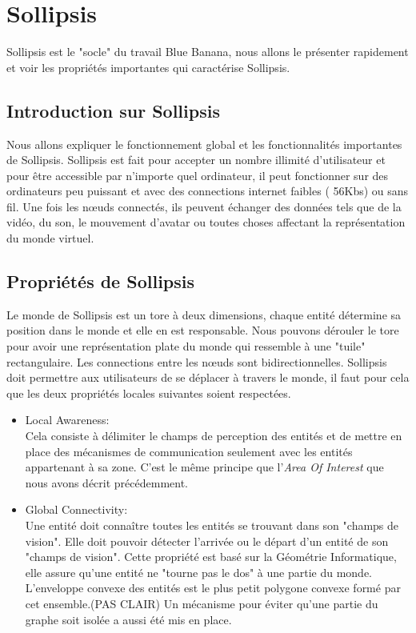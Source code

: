 \section{Sollipsis}
	\label{sollipsis}
	Sollipsis est le "socle" du travail Blue Banana, nous allons le présenter rapidement et voir les propriétés importantes qui caractérise Sollipsis.
	\subsection{Introduction sur Sollipsis} 
	Nous allons expliquer le fonctionnement global et les fonctionnalités importantes de Sollipsis. Sollipsis est fait pour accepter un nombre illimité d'utilisateur et pour être accessible par n'importe quel ordinateur, il peut fonctionner sur des ordinateurs peu puissant et avec des connections internet faibles ( 56Kbs) ou sans fil. Une fois les nœuds connectés, ils peuvent échanger des données tels que de la vidéo, du son, le mouvement d'avatar ou toutes choses affectant la représentation du monde virtuel. \\
	\subsection{Propriétés de Sollipsis}
	Le monde de Sollipsis est un tore à deux dimensions, chaque entité détermine sa position dans le monde et elle en est responsable. Nous pouvons dérouler le tore pour avoir une représentation plate du monde qui ressemble à une "tuile" rectangulaire. Les connections entre les nœuds sont bidirectionnelles. Sollipsis doit permettre aux utilisateurs de se déplacer à travers le monde, il faut pour cela que les deux propriétés locales suivantes soient respectées.
	\begin{itemize}
		\item Local Awareness:\\
		Cela consiste à délimiter le champs de perception des entités et de mettre en place des mécanismes de communication seulement avec les entités appartenant à sa zone. C'est le même principe que l'\textit{Area Of Interest} que nous avons décrit précédemment. 
		\item Global Connectivity:\\
		Une entité doit connaître toutes les entités se trouvant dans son "champs de vision". Elle doit pouvoir détecter l'arrivée ou le départ d'un entité de son "champs de vision". Cette propriété est basé sur la Géométrie Informatique, elle assure qu'une entité ne "tourne pas le dos" à une partie du monde. L'enveloppe convexe des entités est le plus petit polygone convexe formé par cet ensemble.(PAS CLAIR) Un mécanisme pour éviter qu'une partie du graphe soit isolée a aussi été mis en place.\\
	\end{itemize}

